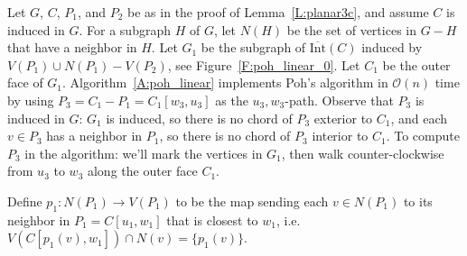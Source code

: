 \documentclass[12pt,letterpaper]{article}
\newcommand{\graphintc}{\overline{\text{Int}}}
\theoremstyle{plain}
\theoremstyle{definition}
\theoremstyle{break}
\begin{document}
Let $G$, $C$, $P_1$, and $P_2$ be as in the proof of Lemma~\ref{L:planar3c},
and assume $C$ is induced in $G$.
For a subgraph $H$ of $G$, let $N(H)$ be the set of
vertices in $G-H$ that have a neighbor in $H$.
Let $G_1$ be the subgraph of $\graphintc(C)$ induced by
$V(P_1)\cup N(P_1)-V(P_2)$, see Figure~\ref{F:poh_linear_0}. Let $C_1$
be the outer face of $G_1$.
Algorithm~\ref{A:poh_linear} implements Poh's algorithm in $\mathcal{O}(n)$ time
by using $P_3=C_1-P_1=C_1[w_3,u_3]$ as the $u_3,w_3$-path.
Observe that $P_3$ is induced in $G$: $G_1$ is induced, so there is no chord of
$P_3$ exterior to $C_1$,
and each $v\in P_3$ has a neighbor in $P_1$, so there is no chord of $P_3$
interior to $C_1$.
To compute $P_3$ in the algorithm: we'll mark the vertices in $G_1$,
then walk counter-clockwise from $u_3$ to $w_3$ along the outer face $C_1$.

Define $p_1:N(P_1)\to V(P_1)$ to be the map sending each $v\in N(P_1)$
to its neighbor in $P_1=C[u_1,w_1]$ that is closest to $w_1$,
i.e. $V(C[p_1(v),w_1])\cap N(v)=\{p_1(v)\}$.
\end{document}
